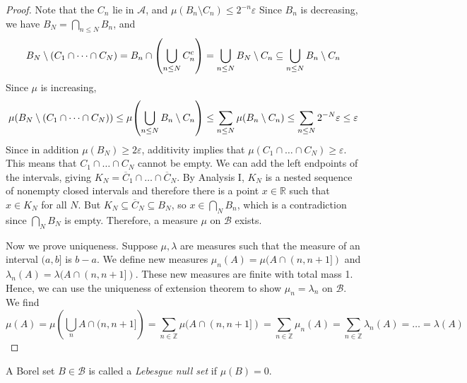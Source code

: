 \begin{proof}
	Note that the \( C_n \) lie in \( \mathcal A \), and \( \mu(B_n \setminus C_n) \leq 2^{-n}\varepsilon \)
	Since \( B_n \) is decreasing, we have \( B_N = \bigcap_{n \leq N} B_n \), and
	\[ B_N \setminus (C_1 \cap \dots \cap C_N) = B_n \cap \qty(\bigcup_{n \leq N} C_n^c) = \bigcup_{n \leq N} B_N \setminus C_n \subseteq \bigcup_{n \leq N} B_n \setminus C_n \]
	Since \( \mu \) is increasing,
	\[ \mu(B_N \setminus (C_1 \cap \dots \cap C_N)) \leq \mu\qty(\bigcup_{n \leq N} B_n \setminus C_n) \leq \sum_{n \leq N} \mu(B_n \setminus C_n) \leq \sum_{n \leq N} 2^{-N}\varepsilon \leq \varepsilon \]
	Since in addition \( \mu(B_N) \geq 2\varepsilon \), additivity implies that \( \mu(C_1 \cap \dots \cap C_N) \geq \varepsilon \).
	This means that \( C_1 \cap \dots \cap C_N \) cannot be empty.
	We can add the left endpoints of the intervals, giving \( K_N = \overline C_1 \cap \dots \cap \overline C_N \).
	By Analysis I, \( K_N \) is a nested sequence of nonempty closed intervals and therefore there is a point \( x \in \mathbb R \) such that \( x \in K_N \) for all \( N \).
	But \( K_N \subseteq \overline C_N \subseteq B_N \), so \( x \in \bigcap_N B_n \), which is a contradiction since \( \bigcap_N B_N \) is empty.
	Therefore, a measure \( \mu \) on \( \mathcal B \) exists.

	Now we prove uniqueness.
	Suppose \( \mu, \lambda \) are measures such that the measure of an interval \( (a,b] \) is \( b - a \).
	We define new measures \( \mu_n(A) = \mu(A \cap (n,n+1]) \) and \( \lambda_n(A) = \lambda(A \cap (n,n+1]) \).
	These new measures are finite with total mass 1.
	Hence, we can use the uniqueness of extension theorem to show \( \mu_n = \lambda_n \) on \( \mathcal B \).
	We find
	\[ \mu(A) = \mu\left(\bigcup_n A \cap (n,n+1]\right) = \sum_{n \in \mathbb Z} \mu(A \cap (n,n+1]) = \sum_{n \in \mathbb Z} \mu_n(A) = \sum_{n \in \mathbb Z} \lambda_n(A) = \dots = \lambda(A) \]
\end{proof}
\begin{definition}
	A Borel set \( B \in \mathcal B \) is called a \emph{Lebesgue null set} if \( \mu(B) = 0 \).
\end{definition}
